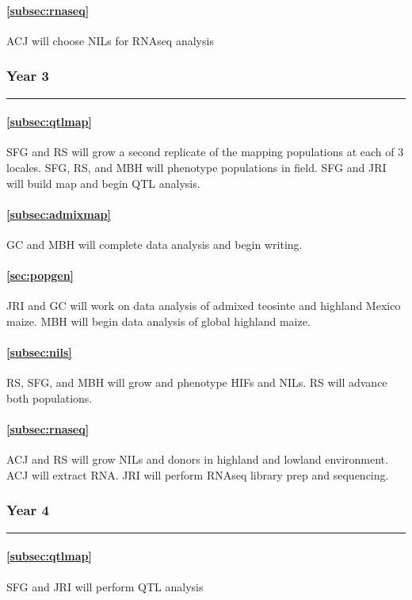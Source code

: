 \paragraph{ \bf   \ref{subsec:rnaseq}} ACJ will choose NILs for RNAseq analysis

\subsubsection*{Year 3} \hrule \vspace{0.1cm}

\paragraph{  \bf \ref{subsec:qtlmap}} SFG and RS will grow a second replicate of the mapping populations at each of 3 locales.  SFG, RS, and MBH will phenotype populations in field. SFG and JRI will build map and begin QTL analysis.
\paragraph{  \bf  \ref{subsec:admixmap}} GC and MBH will complete data analysis and begin writing.
\paragraph{  \bf  \ref{sec:popgen}} JRI and GC will work on data analysis of admixed teosinte and highland Mexico maize. MBH will begin data analysis of global highland maize.
\paragraph{ \bf \ref{subsec:nils}} RS, SFG, and MBH will grow and phenotype HIFs and NILs. RS will advance both populations.
\paragraph{ \bf   \ref{subsec:rnaseq}} ACJ and RS will grow NILs and donors in highland and lowland environment.  ACJ will extract RNA. JRI will perform RNAseq library prep and sequencing.

\subsubsection*{Year 4} \hrule \vspace{0.1cm}

\paragraph{  \bf \ref{subsec:qtlmap}} SFG and JRI will perform QTL analysis
